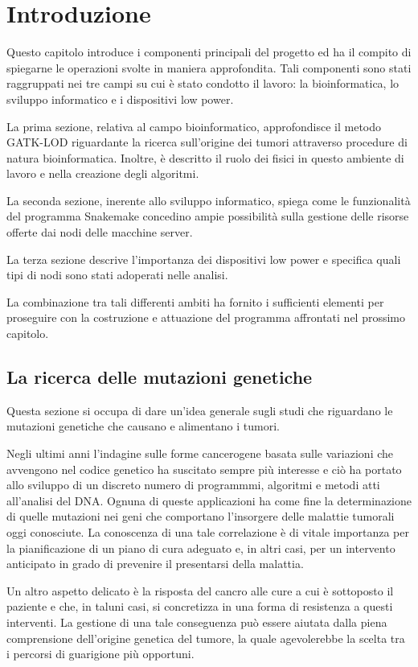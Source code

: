 \chapter{Introduzione}
Questo capitolo introduce i componenti principali del progetto ed ha il compito di spiegarne le operazioni svolte in maniera approfondita.
Tali componenti sono stati raggruppati nei tre campi su cui è stato condotto il lavoro: la bioinformatica, lo sviluppo informatico e i dispositivi low power.

La prima sezione, relativa al campo bioinformatico, approfondisce il metodo GATK-LOD riguardante la ricerca sull'origine dei tumori attraverso procedure di natura bioinformatica.
Inoltre, è descritto il ruolo dei fisici in questo ambiente di lavoro e nella creazione degli algoritmi.

La seconda sezione, inerente allo sviluppo informatico, spiega come le funzionalità del programma Snakemake concedino ampie possibilità sulla gestione delle risorse offerte dai nodi delle macchine server.

La terza sezione descrive l'importanza dei dispositivi low power e specifica quali tipi di nodi sono stati adoperati nelle analisi.

La combinazione tra tali differenti ambiti ha fornito i sufficienti elementi per proseguire con la costruzione e attuazione del programma affrontati nel prossimo capitolo.


\section{La ricerca delle mutazioni genetiche}
Questa sezione si occupa di dare un'idea generale sugli studi che riguardano le mutazioni genetiche che causano e alimentano i tumori.

Negli ultimi anni l'indagine sulle forme cancerogene basata sulle variazioni che avvengono nel codice genetico ha suscitato sempre più interesse e ciò ha portato allo sviluppo di un discreto numero di programmmi, algoritmi e metodi atti all'analisi del DNA.
Ognuna di queste applicazioni ha come fine la determinazione di quelle mutazioni nei geni che comportano l'insorgere delle malattie tumorali oggi conosciute.
La conoscenza di una tale correlazione è di vitale importanza per la pianificazione di un piano di cura adeguato e, in altri casi, per un intervento anticipato in grado di prevenire il presentarsi della malattia.

Un altro aspetto delicato è la risposta del cancro alle cure a cui è sottoposto il paziente e che, in taluni casi, si concretizza in una forma di resistenza a questi interventi.
La gestione di una tale conseguenza può essere aiutata dalla piena comprensione dell'origine genetica del tumore, la quale agevolerebbe la scelta tra i percorsi di guarigione più opportuni.

